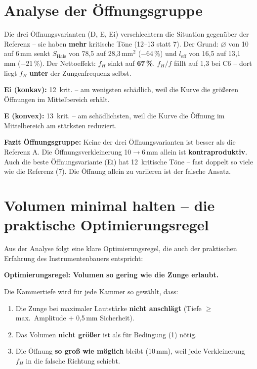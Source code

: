 \documentclass[11pt,a4paper]{article}
\begin{document}
\section{Analyse der Öffnungsgruppe}

Die drei Öffnungsvarianten (D, E, Ei) verschlechtern die Situation gegenüber der Referenz -- sie haben \textbf{mehr} kritische Töne (12--13 statt 7). Der Grund: $\varnothing$ von 10 auf 6\,mm senkt $S_\text{Hals}$ von 78{,}5 auf 28{,}3\,mm$^2$ ($-$64\,\%) und $l_\text{eff}$ von 16{,}5 auf 13{,}1\,mm ($-$21\,\%). Der Nettoeffekt: $f_H$ sinkt auf \textbf{67\,\%}. $f_H/f$ fällt auf 1{,}3 bei C6 -- dort liegt $f_H$ \textbf{unter} der Zungenfrequenz selbst.

\textbf{Ei (konkav):} 12~krit. -- am wenigsten schädlich, weil die Kurve die größeren Öffnungen im Mittelbereich erhält.

\textbf{E (konvex):} 13~krit. -- am schädlichsten, weil die Kurve die Öffnung im Mittelbereich am stärksten reduziert.

\begin{warnbox}
\textbf{Fazit Öffnungsgruppe:} Keine der drei Öffnungsvarianten ist besser als die Referenz A. Die Öffnungsverkleinerung 10$\to$6\,mm allein ist \textbf{kontraproduktiv}. Auch die beste Öffnungsvariante (Ei) hat 12~kritische Töne -- fast doppelt so viele wie die Referenz (7). Die Öffnung allein zu variieren ist der falsche Ansatz.
\end{warnbox}


\section{Volumen minimal halten -- die praktische Optimierungsregel}

Aus der Analyse folgt eine klare Optimierungsregel, die auch der praktischen Erfahrung des Instrumentenbauers entspricht:

\begin{keybox}
\textbf{Optimierungsregel: Volumen so gering wie die Zunge erlaubt.}

Die Kammertiefe wird für jede Kammer so gewählt, dass:
\begin{enumerate}
\item Die Zunge bei maximaler Lautstärke \textbf{nicht anschlägt} (Tiefe $\geq$ max.\ Amplitude $+$ 0{,}5\,mm Sicherheit).
\item Das Volumen \textbf{nicht größer} ist als für Bedingung (1) nötig.
\item Die Öffnung \textbf{so groß wie möglich} bleibt (10\,mm), weil jede Verkleinerung $f_H$ in die falsche Richtung schiebt.
\end{enumerate}
\end{keybox}
\end{document}

